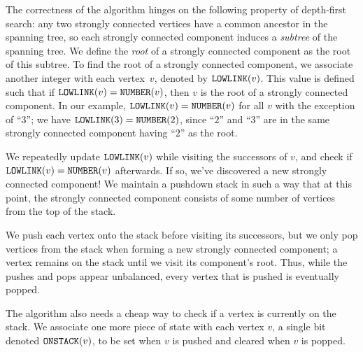 \documentclass[../generics]{subfiles}
\begin{document}
The correctness of the algorithm hinges on the following property of depth-first search: any two strongly connected vertices have a common ancestor in the spanning tree, so each strongly connected component induces a \emph{subtree} of the spanning tree. We define the \emph{root} of a strongly connected component as the root of this subtree. To find the root of a strongly connected component, we associate another integer with each vertex~$v$, denoted by $\texttt{LOWLINK}(v)$. This value is defined such that if $\texttt{LOWLINK}(v)=\texttt{NUMBER}(v)$, then $v$ is the root of a strongly connected component. In our example, $\texttt{LOWLINK}(v)=\texttt{NUMBER}(v)$ for all $v$ with the exception of ``$3$''; we have $\texttt{LOWLINK}(3)=\texttt{NUMBER}(2)$, since ``$2$'' and ``$3$'' are in the same strongly connected component having ``$2$'' as the root.

We repeatedly update $\texttt{LOWLINK}(v)$ while visiting the successors of $v$, and check if $\texttt{LOWLINK}(v)=\texttt{NUMBER}(v)$ afterwards. If so, we've discovered a new strongly connected component! We maintain a pushdown stack in such a way that at this point, the strongly connected component consists of some number of vertices from the top of the stack.

We push each vertex onto the stack before visiting its successors, but we only pop vertices from the stack when forming a new strongly connected component; a vertex remains on the stack until we visit its component's root. Thus, while the pushes and pops appear unbalanced, every vertex that is pushed is eventually popped.

The algorithm also needs a cheap way to check if a vertex is currently on the stack. We associate one more piece of state with each vertex $v$, a single bit denoted $\texttt{ONSTACK}(v)$, to be set when $v$ is pushed and cleared when $v$ is popped.
\end{document}
